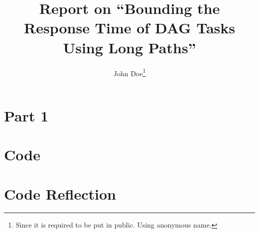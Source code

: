 \documentclass[a4paper]{article}
\title{Report on ``Bounding the Response Time of DAG Tasks Using Long Paths''}
\author{John Doe\thanks{Since it is required to be put in public. Using anonymous name.}}
\numberwithin{equation}{section}
\begin{document}
\maketitle

\section{Part 1}%
\label{sec:summary}


\section{Code}%
\label{sec:code}


\section{Code Reflection}%
\label{sec:code-reflection}




\appendix
\printbibliography
\end{document}
